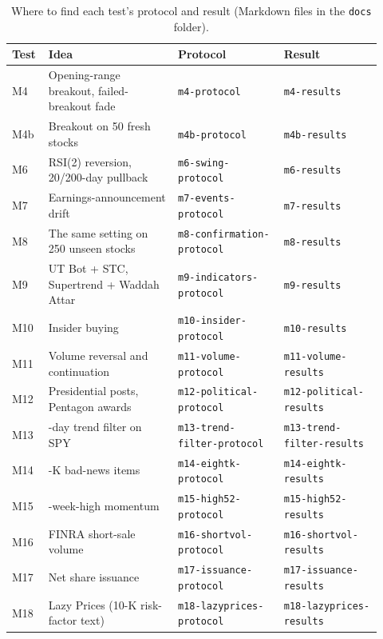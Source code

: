 \documentclass[11pt,a4paper]{article}
\begin{document}
\begin{table}[H]
\centering
\caption{Where to find each test's protocol and result (Markdown files in the \texttt{docs} folder).}\label{tbl:index}
\begin{tabular}{@{}>{\raggedright\arraybackslash}p{0.07\linewidth}>{\raggedright\arraybackslash}p{0.33\linewidth}>{\raggedright\arraybackslash}p{0.27\linewidth}>{\raggedright\arraybackslash}p{0.25\linewidth}@{}}
\toprule
Test & Idea & Protocol & Result \\
\midrule
M4 & Opening-range breakout, failed-breakout fade & \texttt{\footnotesize m4-protocol} & \texttt{\footnotesize m4-results} \\
M4b & Breakout on 50 fresh stocks & \texttt{\footnotesize m4b-protocol} & \texttt{\footnotesize m4b-results} \\
M6 & RSI(2) reversion, 20/200-day pullback & \texttt{\footnotesize m6-swing-protocol} & \texttt{\footnotesize m6-results} \\
M7 & Earnings-announcement drift & \texttt{\footnotesize m7-events-protocol} & \texttt{\footnotesize m7-results} \\
M8 & The same setting on 250 unseen stocks & \texttt{\footnotesize m8-confirmation-protocol} & \texttt{\footnotesize m8-results} \\
M9 & UT Bot + STC, Supertrend + Waddah Attar & \texttt{\footnotesize m9-indicators-protocol} & \texttt{\footnotesize m9-results} \\
M10 & Insider buying & \texttt{\footnotesize m10-insider-protocol} & \texttt{\footnotesize m10-results} \\
M11 & Volume reversal and continuation & \texttt{\footnotesize m11-volume-protocol} & \texttt{\footnotesize m11-volume-results} \\
M12 & Presidential posts, Pentagon awards & \texttt{\footnotesize m12-political-protocol} & \texttt{\footnotesize m12-political-results} \\
M13 & 200-day trend filter on SPY & \texttt{\footnotesize m13-trend-filter-protocol} & \texttt{\footnotesize m13-trend-filter-results} \\
M14 & 8-K bad-news items & \texttt{\footnotesize m14-eightk-protocol} & \texttt{\footnotesize m14-eightk-results} \\
M15 & 52-week-high momentum & \texttt{\footnotesize m15-high52-protocol} & \texttt{\footnotesize m15-high52-results} \\
M16 & FINRA short-sale volume & \texttt{\footnotesize m16-shortvol-protocol} & \texttt{\footnotesize m16-shortvol-results} \\
M17 & Net share issuance & \texttt{\footnotesize m17-issuance-protocol} & \texttt{\footnotesize m17-issuance-results} \\
M18 & Lazy Prices (10-K risk-factor text) & \texttt{\footnotesize m18-lazyprices-protocol} & \texttt{\footnotesize m18-lazyprices-results} \\
\bottomrule
\end{tabular}
\end{table}
\end{document}
